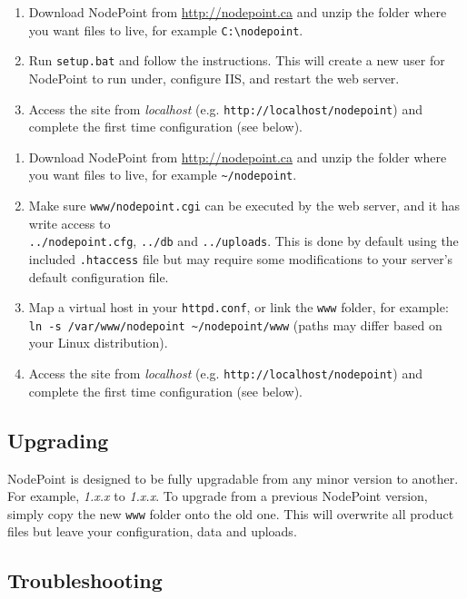 \documentclass[11pt]{article}
\begin{document}
{
\begin{enumerate}
\item Download NodePoint from \url{http://nodepoint.ca} and unzip the folder where you want files to live, for example \texttt{C:\textbackslash nodepoint}.
\item Run \texttt{setup.bat} and follow the instructions. This will create a new user for NodePoint to run under, configure IIS, and restart the web server.
\item Access the site from \textit{localhost} (e.g. \texttt{http://localhost/nodepoint}) and complete the first time configuration (see below).
\end{enumerate}
}
{
\begin{enumerate}
\item Download NodePoint from \url{http://nodepoint.ca} and unzip the folder where you want files to live, for example \texttt{\textasciitilde/nodepoint}.
\item Make sure \texttt{www/nodepoint.cgi} can be executed by the web server, and it has write access to\\ \texttt{../nodepoint.cfg}, \texttt{../db} and \texttt{../uploads}. This is done by default using the included \texttt{.htaccess} file but may require some modifications to your server's default configuration file.
\item Map a virtual host in your \texttt{httpd.conf}, or link the \texttt{www} folder, for example: \texttt{ln -s /var/www/nodepoint \textasciitilde/nodepoint/www} (paths may differ based on your Linux distribution).
\item Access the site from \textit{localhost} (e.g. \texttt{http://localhost/nodepoint}) and complete the first time configuration (see below).
\end{enumerate}
}

\subsection{Upgrading}
NodePoint is designed to be fully upgradable from any minor version to another. For example, \textit{1.x.x} to \textit{1.x.x}. To upgrade from a previous NodePoint version, simply copy the new \texttt{www} folder onto the old one. This will overwrite all product files but leave your configuration, data and uploads.

\subsection{Troubleshooting}
\end{document}

